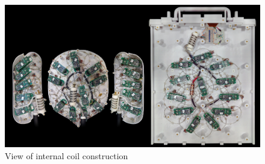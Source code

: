 \begin{figure}
\vspace{2.4in}
\includegraphics[width=6in]{figures/internals_composite.jpg}
\caption{View of internal coil construction}
\label{fig:internals_composite}
\end{figure}
\clearpage
\newpage
